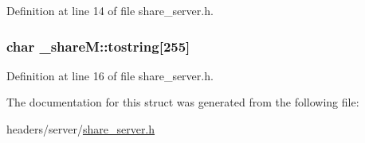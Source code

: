 Definition at line 14 of file share\-\_\-server.\-h.

\hypertarget{struct__share_m_a3f1adf9dcef316bf853e709401b041fd}{
\subsubsection[{tostring}]{\setlength{\rightskip}{0pt plus 5cm}char \-\_\-share\-M\-::tostring\mbox{[}255\mbox{]}}}\label{struct__share_m_a3f1adf9dcef316bf853e709401b041fd}


Definition at line 16 of file share\-\_\-server.\-h.



The documentation for this struct was generated from the following file\-:\begin{DoxyCompactItemize}
\item 
headers/server/\hyperlink{share__server_8h}{share\-\_\-server.\-h}\end{DoxyCompactItemize}
